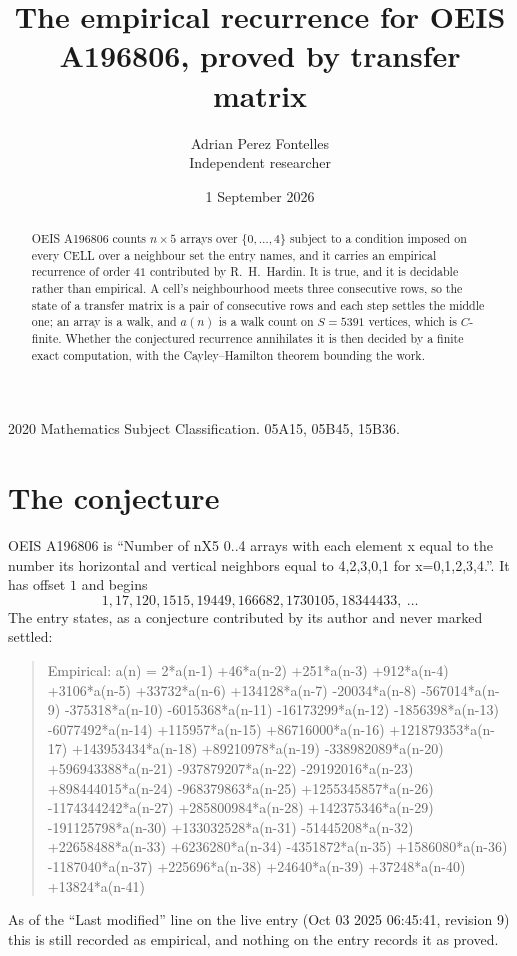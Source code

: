\documentclass[11pt,a4paper]{article}
\title{The empirical recurrence for OEIS A196806, proved by transfer matrix}
\author{Adrian Perez Fontelles\\ \small Independent researcher}
\date{1 September 2026}
\theoremstyle{plain}
\theoremstyle{definition}
\begin{document}
\maketitle

\begin{abstract}
OEIS A196806 counts $n\times5$ arrays over $\{0,\dots,4\}$ subject to a condition imposed on
every CELL over a neighbour set the entry names, and it carries an empirical recurrence of
order $41$ contributed by R.~H.~Hardin. It is true, and it is decidable rather than
empirical. A cell's neighbourhood meets three consecutive rows, so the state of a transfer
matrix is a pair of consecutive rows and each step settles the middle one; an array is a
walk, and $a(n)$ is a walk count on $S=5391$ vertices, which is $C$-finite. Whether the
conjectured recurrence annihilates it is then decided by a finite exact computation, with the
Cayley--Hamilton theorem bounding the work.
\end{abstract}

\noindent\small 2020 Mathematics Subject Classification. 05A15, 05B45, 15B36.\normalsize

\section{The conjecture}

OEIS A196806 is ``Number of nX5 0..4 arrays with each element x equal to the number its horizontal and vertical neighbors equal to 4,2,3,0,1 for x=0,1,2,3,4.''. It has offset $1$ and begins
\[
1, 17, 120, 1515, 19449, 166682, 1730105, 18344433,\ \dots
\]
The entry states, as a conjecture contributed by its author and never marked settled:
\begin{quote}
Empirical: a(n) = 2*a(n-1) +46*a(n-2) +251*a(n-3) +912*a(n-4) +3106*a(n-5) +33732*a(n-6) +134128*a(n-7) -20034*a(n-8) -567014*a(n-9) -375318*a(n-10) -6015368*a(n-11) -16173299*a(n-12) -1856398*a(n-13) -6077492*a(n-14) +115957*a(n-15) +86716000*a(n-16) +121879353*a(n-17) +143953434*a(n-18) +89210978*a(n-19) -338982089*a(n-20) +596943388*a(n-21) -937879207*a(n-22) -29192016*a(n-23) +898444015*a(n-24) -968379863*a(n-25) +1255345857*a(n-26) -1174344242*a(n-27) +285800984*a(n-28) +142375346*a(n-29) -191125798*a(n-30) +133032528*a(n-31) -51445208*a(n-32) +22658488*a(n-33) +6236280*a(n-34) -4351872*a(n-35) +1586080*a(n-36) -1187040*a(n-37) +225696*a(n-38) +24640*a(n-39) +37248*a(n-40) +13824*a(n-41)
\end{quote}
As of the ``Last modified'' line on the live entry (Oct 03 2025 06:45:41, revision 9) this is still
recorded as empirical, and nothing on the entry records it as proved.
\end{document}
